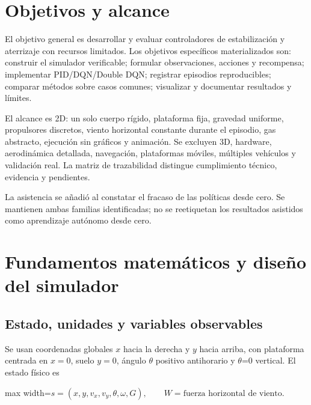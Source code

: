 \documentclass[12pt,a4paper]{article}
\begin{document}
\section{Objetivos y alcance}
El objetivo general es desarrollar y evaluar controladores de estabilización y aterrizaje con recursos limitados. Los objetivos específicos materializados son: construir el simulador verificable; formular observaciones,\allowbreak{} acciones y recompensa; implementar PID/\allowbreak{}DQN/\allowbreak{}Double DQN; registrar episodios reproducibles; comparar métodos sobre casos comunes; visualizar y documentar resultados y límites.


El alcance es 2D: un solo cuerpo rígido,\allowbreak{} plataforma fija,\allowbreak{} gravedad uniforme,\allowbreak{} propulsores discretos,\allowbreak{} viento horizontal constante durante el episodio,\allowbreak{} gas abstracto,\allowbreak{} ejecución sin gráficos y animación. Se excluyen 3D,\allowbreak{} hardware,\allowbreak{} aerodinámica detallada,\allowbreak{} navegación,\allowbreak{} plataformas móviles,\allowbreak{} múltiples vehículos y validación real. La \textcolor{Accent}{matriz de trazabilidad} distingue cumplimiento técnico,\allowbreak{} evidencia y pendientes.


La asistencia se añadió al constatar el fracaso de las políticas desde cero. Se mantienen ambas familias identificadas; no se reetiquetan los resultados asistidos como aprendizaje autónomo desde cero.



\section{Fundamentos matemáticos y diseño del simulador}

\subsection{Estado,\allowbreak{} unidades y variables observables}
Se usan coordenadas globales $x$ hacia la derecha y $y$ hacia arriba,\allowbreak{} con plataforma centrada en $x=0$,\allowbreak{} suelo $y=0$,\allowbreak{} ángulo \ensuremath{\theta} positivo antihorario y \ensuremath{\theta}=0 vertical. El estado físico es



\begin{center}\begin{adjustbox}{max width=\linewidth}$\displaystyle s=(x,y,v_x,v_y,\theta,\omega,G),\qquad W=\text{fuerza horizontal de viento}.$\end{adjustbox}\end{center}
\end{document}
